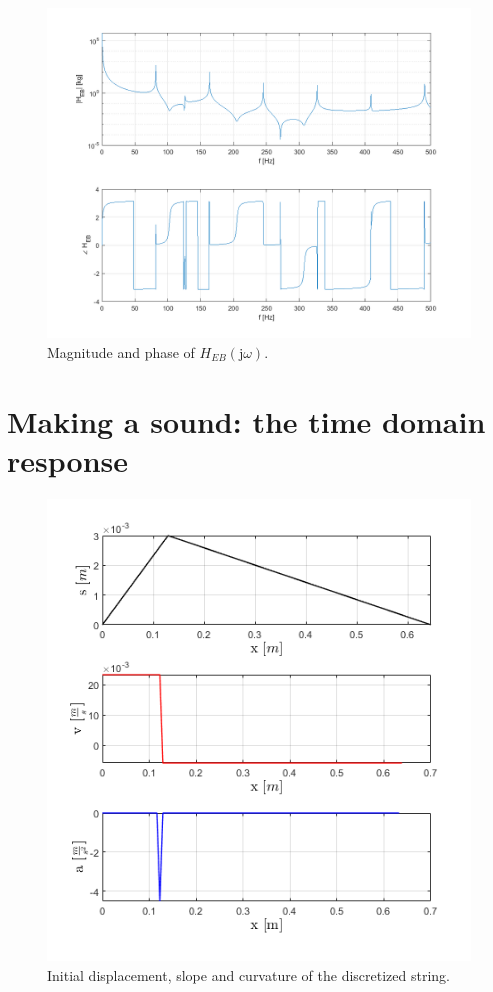 \documentclass[a4paper]{article}
\begin{document}
\begin{figure}[h]
	\centering
	\includegraphics[width=0.75\linewidth]{heb.png}
	\caption{Magnitude and phase of $H_{EB}(\mathrm{j}\omega)$.}
	\label{fig:q2}
\end{figure}



\section{Making a sound: the time domain response}

\begin{figure}[h!]
	\centering
	\includegraphics[width=0.4\linewidth]{spatial.png}
	\caption{Initial displacement, slope and curvature of the discretized string.}
	\label{fig:space}
\end{figure}
\end{document}
